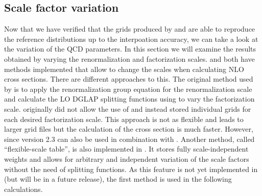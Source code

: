 \subsection{Scale factor variation}
Now that we have verified that the grids produced by \appl{} and \fnlo{} are able to reproduce the reference distributions up to the interpoation accuracy, we can take a look at the variation of the QCD parameters.
In this section we will examine the results obtained by varying the renormalization and factorization scales.
\appl{} and \fnlo{} both have methods implemented that allow to change the scales when calculating NLO cross sections.
There are different approaches to this.
The original method used by \appl{} is to apply the renormalization group equation for the renormalization scale and calculate the LO DGLAP splitting functions using \hoppet{} \cite{hoppet} to vary the factorization scale.
\fnlo{} originally did not allow the use of \hoppet{} and instead stored individual grids for each desired factorization scale.
This approach is not as flexible and leads to larger grid files but the calculation of the cross section is much faster.
However, since version 2.3 \fnlo{} can also be used in combination with \hoppet{}.
Another method, called \enquote{flexible-scale table}, is also implemented in \fnlo{}.
It stores fully scale-independent weights and allows for arbitrary and independent variation of the scale factors without the need of splitting functions.
As this feature is not yet implemented in \mcgrid{} (but will be in a future release), the first method is used in the following calculations.


